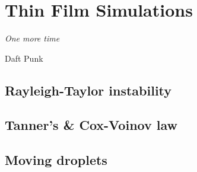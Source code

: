 \chapter{Thin Film Simulations}\label{chapter:test_problems}
\epigraph{\textit{One more time}}{Daft Punk}


\section{Rayleigh-Taylor instability}\label{sec:rayleigh-taylor}

\section{Tanner's \& Cox-Voinov law}\label{sec:droplet_relaxing}

\section{Moving droplets}\label{sec:moving drops}